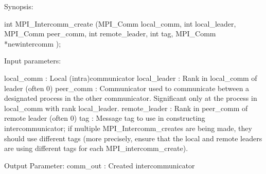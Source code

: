 Synopsis:

int MPI_Intercomm_create
   (MPI_Comm local_comm, int local_leader,
    MPI_Comm peer_comm,  int remote_leader,
    int tag, MPI_Comm *newintercomm
);

Input parameters:

local_comm : Local (intra)communicator
local_leader : Rank in local_comm of leader (often 0)
peer_comm : Communicator used to communicate between a designated process in
    the other communicator. Significant only at the process in local_comm
    with rank local_leader.
remote_leader : Rank in peer_comm of remote leader (often 0)
tag : Message tag to use in constructing intercommunicator; if multiple
    MPI_Intercomm_creates are being made, they should use different tags
    (more precisely, ensure that the local and remote leaders are using
    different tags for each MPI_intercomm_create).

Output Parameter:
comm_out : Created intercommunicator

